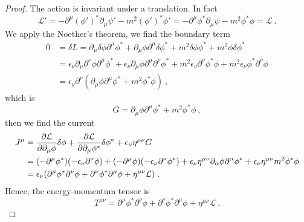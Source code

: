     \begin{proof}
        The action is invariant under a translation. In fact 
        \begin{equation*}
            \mathcal L' = - \partial^\mu (\phi')^* \partial_\mu \psi' - m^2 (\phi')^* \phi' = - \partial^\mu \phi^* \partial_\mu \psi - m^2 \phi^* \phi = \mathcal L ~.
        \end{equation*}
        We apply the Noether's theorem, we find the boundary term
        \begin{equation*}
        \begin{aligned}
            0 & = \delta L = \partial_\mu \delta \phi \partial^\mu \phi^* + \partial_\mu \phi \partial^\mu \delta \phi^* + m^2 \delta \phi \phi^* + m^2 \phi \delta \phi^* \\ & = \epsilon_\nu \partial_\mu \partial^\nu \phi \partial^\mu \phi^* + \epsilon_\nu \partial_\mu \phi \partial^\mu \partial^\nu \phi^* + m^2 \epsilon_\nu \partial^\nu \phi^* \phi + m^2 \epsilon_\nu \phi^* \partial^\nu \phi \\ & = \epsilon_\nu \partial^\nu (\partial_\mu \phi \partial^\mu \phi^* + m^2 \phi^* \phi) ~,
        \end{aligned}
        \end{equation*}
        which is 
        \begin{equation*}
            G = \partial_\mu \phi \partial^\mu \phi^* + m^2 \phi^* \phi ~,
        \end{equation*}
        then we find the current
        \begin{equation*}
        \begin{aligned}
            J^\mu & = \frac{\partial\mathcal L}{\partial\partial_\mu \phi} \delta \phi + \frac{\partial\mathcal L}{\partial\partial_\mu \phi^*} \delta \phi^* + \epsilon_\nu \eta^{\mu\nu} G \\ & = (- \partial^\mu \phi^*) (- \epsilon_\nu \partial^\nu \phi) + (- \partial^\mu \phi) (- \epsilon_\nu \partial^\nu \phi^*) + \epsilon_\nu \eta^{\mu\nu} \partial_\alpha \phi \partial^\alpha \phi^* + \epsilon_\nu \eta^{\mu\nu} m^2 \phi^* \phi \\ & = \epsilon_\nu (\partial^\mu \phi^* \partial^\nu \phi + \partial^\nu \phi^* \partial^\mu \phi + \eta^{\mu\nu} \mathcal L) ~.
        \end{aligned}
        \end{equation*}
        Hence, the energy-momentum tensor is 
        \begin{equation*}
            T^{\mu\nu} = \partial^\mu \phi^* \partial^\nu \phi + \partial^\nu \phi^* \partial^\mu \phi + \eta^{\mu\nu} \mathcal L ~.
        \end{equation*}
    \end{proof}

